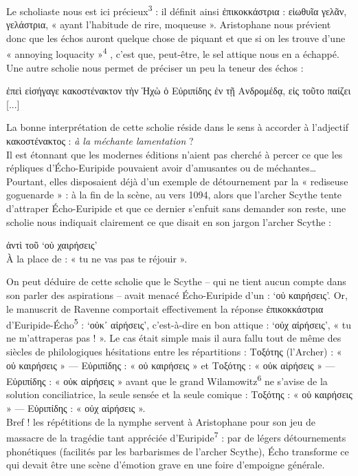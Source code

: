 \documentclass[12pt]{book}%
\newcommand{\italique}[1]{\textit{#1}}%
\newcommand{\citComm}[1]{\begin{quoting}[vskip=0pt] #1 \end{quoting}}%
\newcommand{\anglais}[1]{ #1}%
\newcommand{\marqueur}[1]{\textsuperscript{#1}}%
\newenvironment{groupe}{%
\pstart%
\ledgroup%
}{%
\pend %
}%
\begin{document}
\begin{pages}
\begin{Leftside}
\begin{groupe}
{{Le scholiaste nous est ici précieux\marqueur{3} : il définit ainsi ἐπικοκκάστρια : εἰωθυῖα γελᾶν, γελάστρια, « ayant l'habitude de rire, moqueuse ». Aristophane nous prévient donc que les échos auront quelque chose de piquant et que si on les trouve d'une « \anglais{annoying loquacity} »\marqueur{4} , c'est que, peut-être, le sel attique nous en a échappé.\\
Une autre scholie nous permet de préciser un peu la teneur des échos :%
\citComm{ἐπεὶ εἰσήγαγε κακοστένακτον τὴν Ἡχὼ ὁ Εὐριπίδης ἐν τῇ Ανδρομέδᾳ, εἰς τοῦτο παίζει [...]}%
La bonne interprétation de cette scholie réside dans le sens à accorder à l'adjectif κακοστένακτος : \italique{à la méchante lamentation} ?\\
Il est étonnant que les modernes éditions n'aient pas cherché à percer ce que les répliques d'Écho-Euripide pouvaient avoir d'amusantes ou de méchantes… Pourtant, elles disposaient déjà d'un exemple de détournement par la « rediseuse goguenarde » : à la fin de la scène, au vers 1094, alors que l'archer Scythe tente d'attraper Écho-Euripide et que ce dernier s'enfuit sans demander son reste, une scholie nous indiquait clairement ce que disait en son jargon l'archer Scythe :%
\citComm{ἀντὶ τοῦ `οὐ χαιρήσεις'\\
À la place de : « tu ne vas pas te réjouir ».}%
On peut déduire de cette scholie que le Scythe – qui ne tient aucun compte dans son parler des aspirations – avait menacé Écho-Euripide d'un : `οὐ καιρήσεις'. Or, le manuscrit de Ravenne comportait effectivement la réponse ἐπικοκκάστρια d'Euripide-Écho\marqueur{5} : `οὐκ᾽ αἰρήσεις', c'est-à-dire en bon attique : `οὐχ αἱρήσεις', « tu ne m'attraperas pas ! ». Le cas était simple mais il aura fallu tout de même des siècles de philologiques hésitations entre les répartitions : Τοξότης (l'Archer) : « οὐ καιρήσεις » — Εὐριπίδης : « οὐ καιρήσεις » et Τοξότης : « οὐκ αἰρήσεις » — Εὐριπίδης : « οὐκ αἰρήσεις » avant que le grand Wilamowitz\marqueur{6} ne s'avise de la solution conciliatrice, la seule sensée et la seule comique : Τοξότης : « οὐ καιρήσεις » — Εὐριπίδης : « οὐχ αἱρήσεις ».\\
Bref ! les répétitions de la nymphe servent à Aristophane pour son jeu de massacre de la tragédie tant appréciée d'Euripide\marqueur{7} : par de légers détournements phonétiques (facilités par les barbarismes de l'archer Scythe), Écho transforme ce qui devait être une scène d'émotion grave en une foire d'empoigne générale.\\
}}
\end{groupe}
\end{Leftside}
\end{pages}
\end{document}
